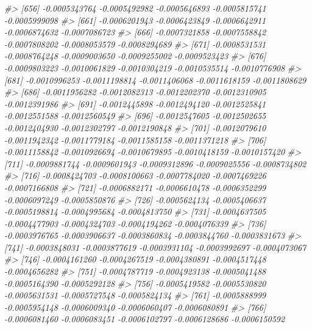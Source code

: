 \documentclass[
]{article}
\newenvironment{Shaded}{\begin{snugshade}}{\end{snugshade}}
\newcommand{\CommentTok}[1]{\textcolor[rgb]{0.56,0.35,0.01}{\textit{#1}}}
\begin{document}
\begin{Shaded}
\begin{Highlighting}[]
\CommentTok{\#\textgreater{} [656] {-}0.0005343764 {-}0.0005492982 {-}0.0005646893 {-}0.0005815741 {-}0.0005999098}
\CommentTok{\#\textgreater{} [661] {-}0.0006201943 {-}0.0006423849 {-}0.0006642911 {-}0.0006874632 {-}0.0007086723}
\CommentTok{\#\textgreater{} [666] {-}0.0007321858 {-}0.0007558842 {-}0.0007808202 {-}0.0008053579 {-}0.0008294689}
\CommentTok{\#\textgreater{} [671] {-}0.0008531531 {-}0.0008764248 {-}0.0009003650 {-}0.0009255002 {-}0.0009523423}
\CommentTok{\#\textgreater{} [676] {-}0.0009803223 {-}0.0010061829 {-}0.0010304219 {-}0.0010535514 {-}0.0010776908}
\CommentTok{\#\textgreater{} [681] {-}0.0010996253 {-}0.0011198814 {-}0.0011406068 {-}0.0011618159 {-}0.0011808629}
\CommentTok{\#\textgreater{} [686] {-}0.0011956282 {-}0.0012082313 {-}0.0012202370 {-}0.0012310905 {-}0.0012391986}
\CommentTok{\#\textgreater{} [691] {-}0.0012445898 {-}0.0012494120 {-}0.0012525841 {-}0.0012551588 {-}0.0012560549}
\CommentTok{\#\textgreater{} [696] {-}0.0012547605 {-}0.0012502655 {-}0.0012404930 {-}0.0012302797 {-}0.0012190848}
\CommentTok{\#\textgreater{} [701] {-}0.0012079610 {-}0.0011942342 {-}0.0011779184 {-}0.0011585158 {-}0.0011371218}
\CommentTok{\#\textgreater{} [706] {-}0.0011158842 {-}0.0010926694 {-}0.0010679895 {-}0.0010418159 {-}0.0010157420}
\CommentTok{\#\textgreater{} [711] {-}0.0009881744 {-}0.0009601943 {-}0.0009312896 {-}0.0009025556 {-}0.0008734802}
\CommentTok{\#\textgreater{} [716] {-}0.0008424703 {-}0.0008100663 {-}0.0007784020 {-}0.0007469226 {-}0.0007166808}
\CommentTok{\#\textgreater{} [721] {-}0.0006882171 {-}0.0006610478 {-}0.0006352299 {-}0.0006097249 {-}0.0005850876}
\CommentTok{\#\textgreater{} [726] {-}0.0005624134 {-}0.0005406637 {-}0.0005198814 {-}0.0004995684 {-}0.0004813750}
\CommentTok{\#\textgreater{} [731] {-}0.0004637505 {-}0.0004477903 {-}0.0004324703 {-}0.0004194262 {-}0.0004076339}
\CommentTok{\#\textgreater{} [736] {-}0.0003976765 {-}0.0003906637 {-}0.0003860834 {-}0.0003844760 {-}0.0003831673}
\CommentTok{\#\textgreater{} [741] {-}0.0003848031 {-}0.0003877619 {-}0.0003931104 {-}0.0003992697 {-}0.0004073067}
\CommentTok{\#\textgreater{} [746] {-}0.0004161260 {-}0.0004267519 {-}0.0004380891 {-}0.0004517448 {-}0.0004656282}
\CommentTok{\#\textgreater{} [751] {-}0.0004787719 {-}0.0004923138 {-}0.0005041488 {-}0.0005164390 {-}0.0005292128}
\CommentTok{\#\textgreater{} [756] {-}0.0005419582 {-}0.0005530820 {-}0.0005631531 {-}0.0005727548 {-}0.0005824134}
\CommentTok{\#\textgreater{} [761] {-}0.0005888999 {-}0.0005954148 {-}0.0006009340 {-}0.0006060407 {-}0.0006080891}
\CommentTok{\#\textgreater{} [766] {-}0.0006081460 {-}0.0006083451 {-}0.0006102797 {-}0.0006128686 {-}0.0006150592}

\end{Highlighting}
\end{Shaded}
\end{document}
